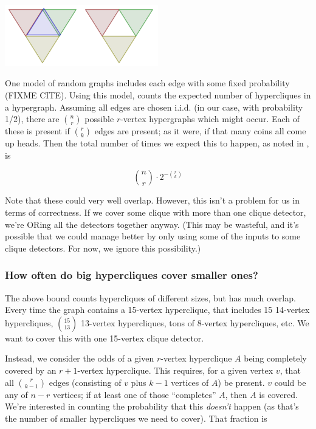 \documentclass[12pt]{article}
\theoremstyle{definition}
\begin{document}
\includegraphics[width=0.5\textwidth]{R/maximal.pdf}

One model of random graphs
includes each edge with some fixed probability (FIXME CITE). Using this model,
\cite{bollobas1976cliques}
counts the expected number of hypercliques in a hypergraph. Assuming all
edges are chosen i.i.d. (in our case, with probability 1/2),
there are ${n \choose r}$ possible $r$-vertex hypergraphs which might
occur. Each of these is present if ${r \choose k}$ edges are present; as it
were, if that many coins all come up heads. Then the total number of times
we expect this to happen, as noted in \cite{bollobas1976cliques}, is

\[
{n \choose r} \cdot 2^{-{r \choose k}}
\]

Note that these could very well overlap. However, this isn't a problem for
us in terms of correctness. If we cover some clique
with more than one
clique detector, we're
ORing all the detectors together anyway. (This may be wasteful, and it's
possible that we could manage better by only using some of the inputs to
some clique detectors. For now, we ignore this possibility.)

\subsubsection{How often do big hypercliques cover smaller ones?}

The above bound counts hypercliques of different sizes, but has much overlap.
Every time the graph contains a 15-vertex hyperclique, that includes
15 14-vertex hypercliques, ${15 \choose 13}$ 13-vertex hypercliques,
tons of 8-vertex hypercliques, etc. We want to
cover this with one 15-vertex clique detector.

Instead, we consider the odds of a given $r$-vertex hyperclique $A$
being completely
covered by an $r+1$-vertex hyperclique. This requires, for a given vertex
$v$, that all ${r \choose {k-1}}$ edges (consisting of $v$ plus $k-1$ vertices
of $A$) be present. $v$ could be any of $n - r$ vertices; if at least one
 of those
``completes'' $A$, then $A$ is covered. We're interested in counting the
probability that this {\em doesn't} happen (as that's the number of smaller
hypercliques we need to cover). That fraction is
\end{document}
